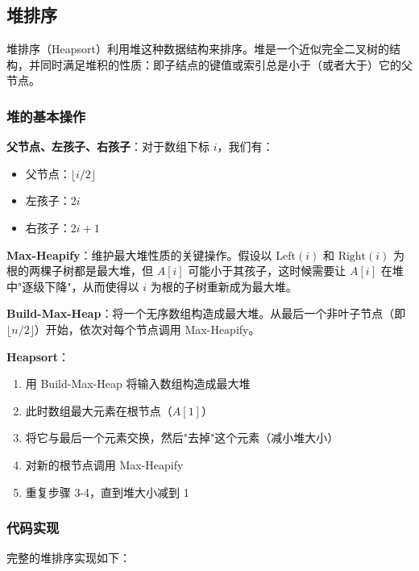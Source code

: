\subsection{堆排序}

堆排序（Heapsort）利用堆这种数据结构来排序。堆是一个近似完全二叉树的结构，并同时满足堆积的性质：即子结点的键值或索引总是小于（或者大于）它的父节点。

\subsubsection{堆的基本操作}

\textbf{父节点、左孩子、右孩子}：对于数组下标 \( i \)，我们有：
\begin{itemize}
    \item 父节点：\( \lfloor i/2 \rfloor \)
    \item 左孩子：\( 2i \)
    \item 右孩子：\( 2i+1 \)
\end{itemize}

\textbf{Max-Heapify}：维护最大堆性质的关键操作。假设以 \( \text{Left}(i) \) 和 \( \text{Right}(i) \) 为根的两棵子树都是最大堆，但 \( A[i] \) 可能小于其孩子，这时候需要让 \( A[i] \) 在堆中"逐级下降"，从而使得以 \( i \) 为根的子树重新成为最大堆。

\textbf{Build-Max-Heap}：将一个无序数组构造成最大堆。从最后一个非叶子节点（即 \( \lfloor n/2 \rfloor \)）开始，依次对每个节点调用 Max-Heapify。

\textbf{Heapsort}：
\begin{enumerate}
    \item 用 Build-Max-Heap 将输入数组构造成最大堆
    \item 此时数组最大元素在根节点（\( A[1] \)）
    \item 将它与最后一个元素交换，然后"去掉"这个元素（减小堆大小）
    \item 对新的根节点调用 Max-Heapify
    \item 重复步骤 3-4，直到堆大小减到 1
\end{enumerate}

\subsubsection{代码实现}

完整的堆排序实现如下：

